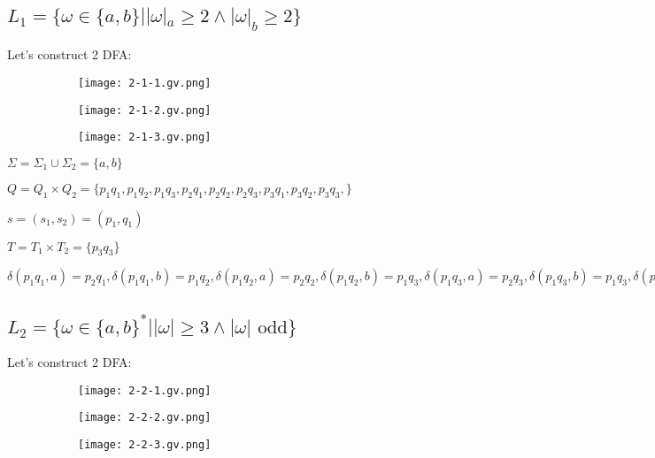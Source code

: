 \documentclass{article}
\begin{document}
\subsection{$L_{1}=\{\omega \in \{a,b\} | |\omega|_{a}\geq 2 \wedge|\omega|_{b}\geq 2  \}$}
Let's construct 2 DFA:
\begin{figure}[h]
\begin{subfigure}
\centering
\texttt{[image: 2-1-1.gv.png]}
\end{subfigure}
\begin{subfigure}
\centering
\texttt{[image: 2-1-2.gv.png]}
\end{subfigure}
\begin{subfigure}
\centering
\texttt{[image: 2-1-3.gv.png]}
\end{subfigure}
\end{figure}

$\Sigma=\Sigma_{1} \cup \Sigma_{2} = \{a,b\}$

$Q = Q_{1} \times Q_{2} = \{p_{1}q_{1}, p_{1}q_{2}, p_{1}q_{3}, p_{2}q_{1}, p_{2}q_{2}, p_{2}q_{3}, p_{3}q_{1}, p_{3}q_{2}, p_{3}q_{3},\}$

$s =(s_{1}, s_{2}) = (p_{1}, q_{1})$

$T = T_{1} \times T_{2} =\{p_{3}q_{3} \}$

$\delta(p_{1}q_{1},a)=p_{2}q_{1},\delta(p_{1}q_{1},b)=p_{1}q_{2},\delta(p_{1}q_{2},a)=p_{2}q_{2},\delta(p_{1}q_{2},b)=p_{1}q_{3},\delta(p_{1}q_{3},a)=p_{2}q_{3},\delta(p_{1}q_{3},b)=p_{1}q_{3},\delta(p_{2}q_{1},a)=p_{3}q_{1},\delta(p_{2}q_{1},b)=p_{2}q_{2},\delta(p_{2}q_{2},a)=p_{3}q_{2},\delta(p_{2}q_{2},b)=p_{2}q_{3},\delta(p_{2}q_{3},a)=p_{3}q_{3},\delta(p_{2}q_{3},b)=p_{2}q_{3},\delta(p_{3}q_{1},a)=p_{3}q_{1},\delta(p_{3}q_{1},b)=p_{3}q_{2},\delta(p_{3}q_{2},a)=p_{3}q_{2},\delta(p_{3}q_{2},b)=p_{3}q_{3},\delta(p_{3}q_{3},a)=p_{3}q_{3},\delta(p_{3}q_{3},b)=p_{3}q_{3}$



\subsection{$L_{2}=\{\omega \in \{a,b\}^* | |\omega|\geq 3 \wedge|\omega| \text{ odd}  \}$}

Let's construct 2 DFA:
\begin{figure}[h]
\begin{subfigure}
\centering
\texttt{[image: 2-2-1.gv.png]}
\end{subfigure}
\begin{subfigure}
\centering
\texttt{[image: 2-2-2.gv.png]}
\end{subfigure}
\begin{subfigure}
\centering
\texttt{[image: 2-2-3.gv.png]}
\end{subfigure}
\end{figure}
\end{document}
